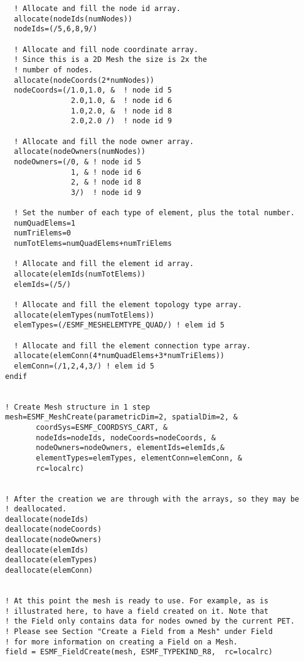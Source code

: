 \begin{verbatim}
    ! Allocate and fill the node id array.
    allocate(nodeIds(numNodes))
    nodeIds=(/5,6,8,9/) 

    ! Allocate and fill node coordinate array.
    ! Since this is a 2D Mesh the size is 2x the
    ! number of nodes.
    allocate(nodeCoords(2*numNodes))
    nodeCoords=(/1.0,1.0, &  ! node id 5
                 2.0,1.0, &  ! node id 6
                 1.0,2.0, &  ! node id 8
                 2.0,2.0 /)  ! node id 9

    ! Allocate and fill the node owner array.
    allocate(nodeOwners(numNodes))
    nodeOwners=(/0, & ! node id 5
                 1, & ! node id 6
                 2, & ! node id 8
                 3/)  ! node id 9

    ! Set the number of each type of element, plus the total number.
    numQuadElems=1
    numTriElems=0
    numTotElems=numQuadElems+numTriElems

    ! Allocate and fill the element id array.
    allocate(elemIds(numTotElems))
    elemIds=(/5/)  

    ! Allocate and fill the element topology type array.
    allocate(elemTypes(numTotElems))
    elemTypes=(/ESMF_MESHELEMTYPE_QUAD/) ! elem id 5

    ! Allocate and fill the element connection type array.
    allocate(elemConn(4*numQuadElems+3*numTriElems))
    elemConn=(/1,2,4,3/) ! elem id 5
  endif

  
  ! Create Mesh structure in 1 step
  mesh=ESMF_MeshCreate(parametricDim=2, spatialDim=2, &
         coordSys=ESMF_COORDSYS_CART, &
         nodeIds=nodeIds, nodeCoords=nodeCoords, &
         nodeOwners=nodeOwners, elementIds=elemIds,&
         elementTypes=elemTypes, elementConn=elemConn, &
         rc=localrc)


  ! After the creation we are through with the arrays, so they may be
  ! deallocated.
  deallocate(nodeIds)
  deallocate(nodeCoords)
  deallocate(nodeOwners)
  deallocate(elemIds)
  deallocate(elemTypes)
  deallocate(elemConn)


  ! At this point the mesh is ready to use. For example, as is 
  ! illustrated here, to have a field created on it. Note that 
  ! the Field only contains data for nodes owned by the current PET.
  ! Please see Section "Create a Field from a Mesh" under Field
  ! for more information on creating a Field on a Mesh. 
  field = ESMF_FieldCreate(mesh, ESMF_TYPEKIND_R8,  rc=localrc)

 
\end{verbatim}
 
